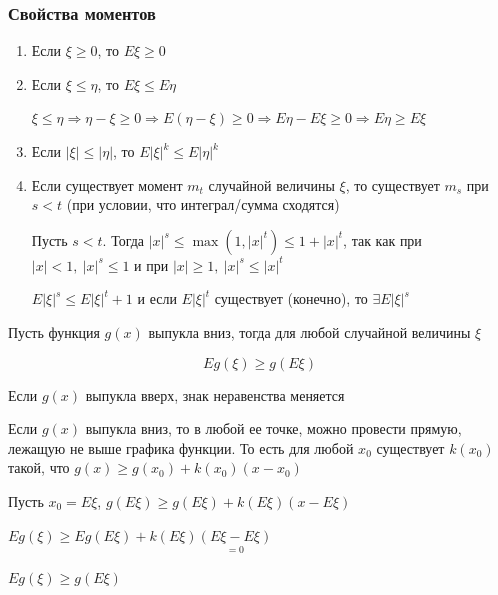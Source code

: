 \documentclass[12pt]{article}
\begin{document}
    \hypertarget{momentsproperties}{}

    \subsubsection{Свойства моментов}

    \begin{enumerate}
        \item Если $\xi \geq 0$, то $E\xi \geq 0$

        \item Если $\xi \leq \eta$, то $E\xi \leq E\eta$

        \begin{MyProof}
            $\xi \leq \eta \Longrightarrow \eta - \xi \geq 0 \Longrightarrow E(\eta - \xi) \geq 0 \Longrightarrow E\eta - E\xi \geq 0 \Longrightarrow E\eta \geq E\xi$
        \end{MyProof}

        \item Если $|\xi| \leq |\eta|$, то $E|\xi|^k \leq E|\eta|^k$

        \item Если существует момент $m_t$ случайной величины $\xi$, то существует $m_s$ при $s < t$ (при условии, что интеграл/сумма сходятся)

        \begin{MyProof}
            Пусть $s < t$. Тогда $|x|^s \leq \max(1, |x|^t) \leq 1 + |x|^t$, так как при $|x| < 1, \ |x|^s \leq 1$ и при $|x| \geq 1, \ |x|^s \leq |x|^t$
        
            $E|\xi|^s \leq E|\xi|^t + 1$ и если $E|\xi|^t$ существует (конечно), то $\exists E|\xi|^s$
        
        \end{MyProof}
    \end{enumerate}

    \hypertarget{jensensinequality}{}

    \begin{MyTheorem}
         Пусть функция $g(x)$ выпукла вниз, тогда для любой случайной величины $\xi$

        \[Eg(\xi) \geq g(E\xi)\]
    \end{MyTheorem}

    \Nota Если $g(x)$ выпукла вверх, знак неравенства меняется
    
    \begin{MyProof}
        Если $g(x)$ выпукла вниз, то в любой ее точке, можно провести прямую, лежащую не выше графика функции. То есть для 
        любой $x_0$ существует $k(x_0)$ такой, что $g(x) \geq g(x_0) + k(x_0) (x - x_0)$

        Пусть $x_0 = E\xi$, $g(E\xi) \geq g(E\xi) + k(E\xi) (x - E\xi)$

        $Eg(\xi) \geq Eg(E\xi) + k(E\xi) \underset{= 0}{(E\xi - E\xi)}$

        $Eg(\xi) \geq g(E\xi)$
    \end{MyProof}
\end{document}
